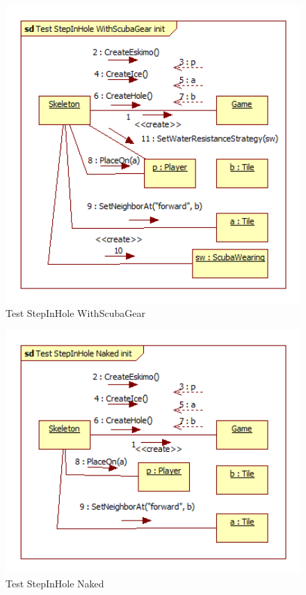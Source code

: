 \begin{figure}[h]
	\begin{center}
		\includegraphics[width=17cm]{chapters/chapter05/diagrams/Test_StepInHole_WithScubaGear_init.png}
		\caption{Test StepInHole WithScubaGear}
		\label{fig:Test StepInHole WithScubaGear}
	\end{center}
\end{figure}

\begin{figure}[h]
	\begin{center}
		\includegraphics[width=17cm]{chapters/chapter05/diagrams/Test_StepInHole_Naked_init.png}
		\caption{Test StepInHole Naked}
		\label{fig:Test StepInHole Naked}
	\end{center}
\end{figure}

